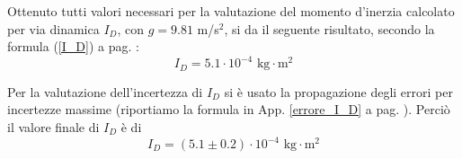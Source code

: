 Ottenuto tutti valori necessari per la valutazione del momento d'inerzia calcolato per via dinamica $I_D$, con $ g = 9.81$ m/s$^2$, si da il seguente risultato, secondo la formula (\ref{I_D}) a pag. \pageref{I_D}:
$$ I_D = 5.1 \cdot 10^{-4} \textrm{ kg} \cdot \textrm{m}^2$$

Per la valutazione dell'incertezza di $I_D$ si è usato la propagazione degli errori per incertezze massime (riportiamo la formula in App. \ref{errore_I_D} a pag. \pageref{errore_I_D}). Perciò il valore finale di $I_D$ è di 
$$ I_D = (5.1 \pm 0.2) \cdot 10^{-4} \textrm{ kg} \cdot \textrm{m}^2$$